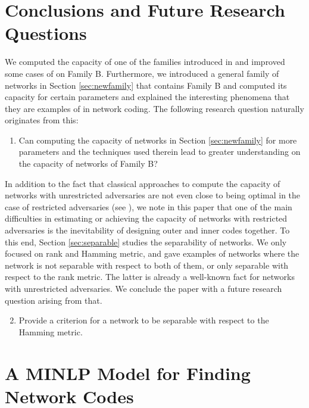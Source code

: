\documentclass[11pt,a4paper]{article}
\theoremstyle{definition}
\begin{document}
\section{Conclusions and Future Research Questions}
\label{sec:conclusion}


We computed the capacity of one of the families introduced in \cite{beemer2023network} and improved some cases of \cite{kurz2022capacity} on Family B. Furthermore, we introduced a general family of networks in Section \ref{sec:newfamily} that contains Family B and computed its capacity for certain parameters and explained the interesting phenomena that they are examples of in network coding. The following research question naturally originates from this: 

\begin{enumerate}
    \item Can computing the capacity of networks in Section \ref{sec:newfamily} for more parameters and the techniques used therein lead to greater understanding on the capacity of networks of Family B?  
\end{enumerate}

In addition to the fact that classical approaches to compute the capacity of networks with unrestricted adversaries are not even close to being optimal in the case of restricted adversaries (see \cite{beemer2023network}), we note in this paper that one of the main difficulties in estimating or achieving the capacity of networks with restricted adversaries is the inevitability of designing outer and inner codes together. To this end, Section \ref{sec:separable} studies the separability of networks. We only focused on rank and Hamming metric, and gave examples of networks where the network is not separable with respect to both of them, or only separable with respect to the rank metric. The latter is already a well-known fact for networks with unrestricted adversaries. We conclude the paper with a future research question arising from that.

\begin{enumerate}\setcounter{enumi}{1}
    \item Provide a criterion for a network to be separable with respect to the Hamming metric. 
\end{enumerate}




\appendix

\section{A MINLP Model for Finding Network Codes}
\label{sec:MINLPmodel}
\end{document}
